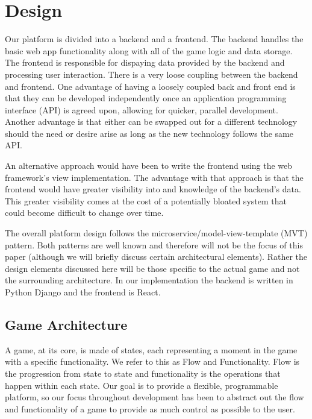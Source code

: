\documentclass{article}
\begin{document}
\section{Design}
    Our platform is divided into a backend and a frontend. The backend handles the basic web app functionality along with all of the game logic and data storage. The frontend is responsible for dispaying data provided by the backend and processing user interaction. There is a very loose coupling between the backend and frontend. One advantage of having a loosely coupled back and front end is that they can be developed independently once an application programming interface (API) is agreed upon, allowing for quicker, parallel development. Another advantage is that either can be swapped out for a different technology should the need or desire arise as long as the new technology follows the same API.
    \smallskip
    
    An alternative approach would have been to write the frontend using the web framework's view implementation. The advantage with that approach is that the frontend would have greater visibility into and knowledge of the backend's data. This greater visibility comes at the cost of a potentially bloated system that could become difficult to change over time.
    \smallskip
    
    The overall platform design follows the microservice/model-view-template (MVT) pattern. Both patterns are well known and therefore will not be the focus of this paper (although we will briefly discuss certain architectural elements). Rather the design elements discussed here will be those specific to the actual game and not the surrounding architecture. In our implementation the backend is written in Python Django and the frontend is React.

	\subsection{Game Architecture}\label{architecture}
	    A game, at its core, is made of states, each representing a moment in the game with a specific functionality. We refer to this as Flow and Functionality. Flow is the progression from state to state and functionality is the operations that happen within each state. Our goal is to provide a flexible, programmable platform, so our focus throughout development has been to abstract out the flow and functionality of a game to provide as much control as possible to the user.
\end{document}
